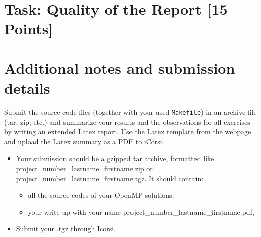 \documentclass[unicode,11pt,a4paper,oneside,numbers=endperiod,openany]{scrartcl}
\begin{document}
\section{Task:  Quality of the Report   [15 Points]}



\section*{Additional notes and submission details}
Submit the source code files (together with your used \texttt{Makefile}) in
an archive file (tar, zip, etc.) and summarize your results and the
observations for all exercises by writing an extended Latex report.
Use the Latex template from the webpage and upload the Latex summary
as a PDF to \href{https://www.icorsi.ch}{iCorsi}.

\begin{itemize}
\item Your submission should be a gzipped tar archive, formatted like project\_number\_lastname\_firstname.zip or project\_number\_lastname\_firstname.tgz. 
      It should contain:
  \begin{itemize}
    \item all the source codes of your OpenMP solutions.
    \item your write-up with your name  project\_number\_lastname\_firstname.pdf, 
  \end{itemize}
   \item Submit your .tgz through Icorsi.
  \end{itemize}
\end{document}
